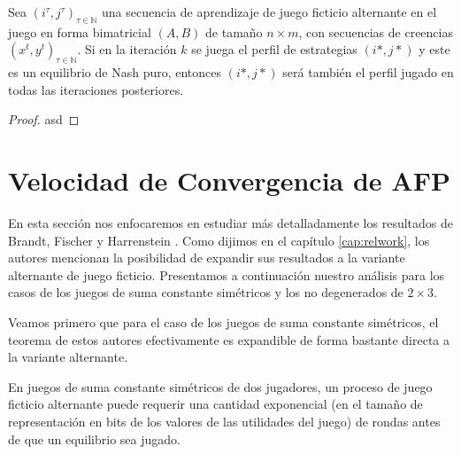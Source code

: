 \begin{theorem}
    Sea $(i^\tau, j^\tau)_{\tau \in \mathbb{N}}$ una secuencia de aprendizaje de juego ficticio alternante en el juego en forma bimatricial $(A, B)$ de tamaño $n \times m$, con secuencias de creencias $(x^t, y^t)_{\tau \in \mathbb{N}}$. Si en la iteración $k$ se juega el perfil de estrategias $(i*, j*)$ y este es un equilibrio de Nash puro, entonces $(i*, j*)$ será también el perfil jugado en todas las iteraciones posteriores.
\end{theorem}

\begin{proof}
    asd 
\end{proof}

\section{Velocidad de Convergencia de AFP}

En esta sección nos enfocaremos en estudiar más detalladamente los resultados de Brandt, Fischer y Harrenstein \cite{brandt:rate:convergence}. Como dijimos en el capítulo \ref{cap:relwork}, los autores mencionan la posibilidad de expandir sus resultados a la variante alternante de juego ficticio. Presentamos a continuación nuestro análisis para los casos de los juegos de suma constante simétricos y los no degenerados de $2 \times 3$.


Veamos primero que para el caso de los juegos de suma constante simétricos, el teorema de estos autores efectivamente es expandible de forma bastante directa a la variante alternante.

\begin{theorem}
    En juegos de suma constante simétricos de dos jugadores, un proceso de juego ficticio alternante puede requerir una cantidad exponencial (en el tamaño de representación en bits de los valores de las utilidades del juego) de rondas antes de que un equilibrio sea jugado.
\end{theorem}

